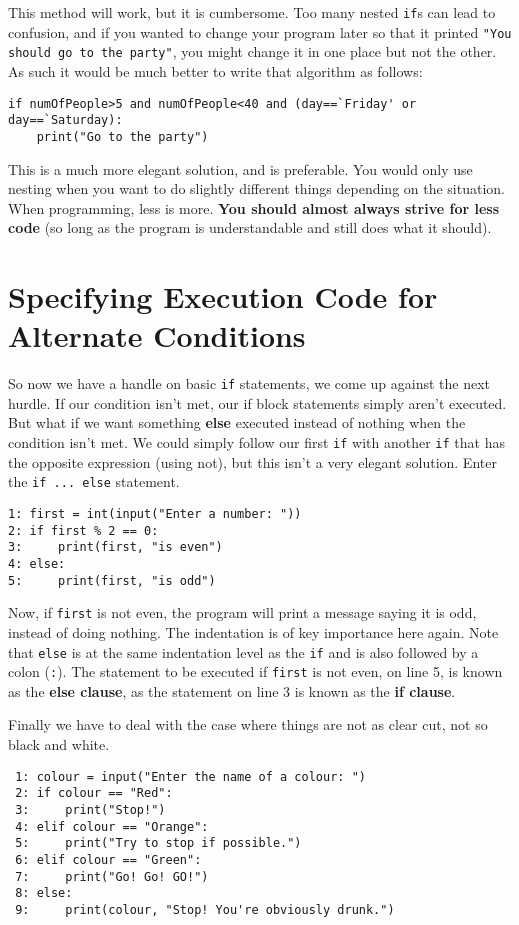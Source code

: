  This method will work, but it is cumbersome. Too many nested \texttt{if}s can lead to confusion, and if you wanted to change your program later so that it printed \texttt{"You should go to the party"}, you might change it in one place but not the other. As such it would be much better to write that algorithm as follows:
\begin{lstlisting}
if numOfPeople>5 and numOfPeople<40 and (day==`Friday' or day==`Saturday):
	print("Go to the party")
\end{lstlisting}

 This is a much more elegant solution, and is preferable. You would only use nesting when you want to do slightly different things depending on the situation. When programming, less is more. \textbf{You should almost always strive for less code} (so long as the program is understandable and still does what it should).



\section{Specifying Execution Code for Alternate Conditions}

So now we have a handle on basic \texttt{if} statements, we come up against   the next hurdle. If our condition isn't met, our if block statements   simply aren't executed. But what if we want something   \textbf{else} executed instead of nothing when the condition   isn't met. We could simply follow our first \texttt{if} with another \texttt{if} that has the opposite expression (using not), but this isn't a very elegant solution. Enter the \texttt{if ... else} statement.
\begin{lstlisting}
1: first = int(input("Enter a number: "))
2: if first % 2 == 0:
3:     print(first, "is even")
4: else:
5:     print(first, "is odd")
\end{lstlisting}

Now, if \texttt{first} is not even, the program will print a message saying   it is odd, instead of doing nothing. The indentation is of key   importance here again. Note that \texttt{else} is at the same indentation   level as the \texttt{if} and is also followed by a colon (\texttt{:}). The statement   to be executed if \texttt{first} is not even, on line 5, is known as the   \textbf{else clause}, as the statement on line 3 is known as   the \textbf{if clause}.

Finally we have to deal with the case where things are not as clear   cut, not so black and white.
\begin{lstlisting}
 1: colour = input("Enter the name of a colour: ")
 2: if colour == "Red":
 3:     print("Stop!")
 4: elif colour == "Orange":
 5:     print("Try to stop if possible.")
 6: elif colour == "Green":
 7:     print("Go! Go! GO!")
 8: else:
 9:     print(colour, "Stop! You're obviously drunk.")
\end{lstlisting}

